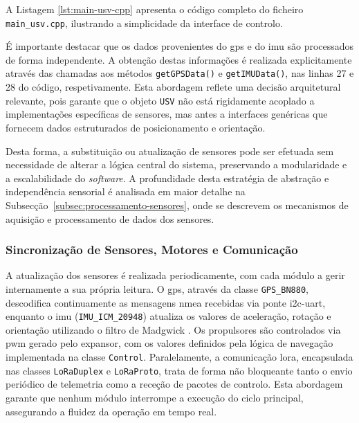 A Listagem \ref{lst:main-usv-cpp} apresenta o código completo do ficheiro \texttt{main\_usv.cpp}, ilustrando a simplicidade da interface de controlo.



É importante destacar que os dados provenientes do \gls{gps} e do \gls{imu} são processados de forma independente. A obtenção destas informações é realizada explicitamente através das chamadas aos métodos \texttt{getGPSData()} e \texttt{getIMUData()}, nas linhas 27 e 28 do código, respetivamente. Esta abordagem reflete uma decisão arquitetural relevante, pois garante que o objeto \texttt{USV} não está rigidamente acoplado a implementações específicas de sensores, mas antes a interfaces genéricas que fornecem dados estruturados de posicionamento e orientação.  

Desta forma, a substituição ou atualização de sensores pode ser efetuada sem necessidade de alterar a lógica central do sistema, preservando a modularidade e a escalabilidade do \emph{software}. A profundidade desta estratégia de abstração e independência sensorial é analisada em maior detalhe na Subsecção~\ref{subsec:processamento-sensores}, onde se descrevem os mecanismos de aquisição e processamento de dados dos sensores.

\subsubsection{Sincronização de Sensores, Motores e Comunicação}  

A atualização dos sensores é realizada periodicamente, com cada módulo a gerir internamente a sua própria leitura. O \gls{gps}, através da classe \texttt{GPS\_BN880}, descodifica continuamente as mensagens \gls{nmea} recebidas via ponte \gls{i2c}-\gls{uart}, enquanto o \gls{imu} (\texttt{IMU\_ICM\_20948}) atualiza os valores de aceleração, rotação e orientação utilizando o filtro de Madgwick \cite{madgwick-filter}. Os propulsores são controlados via \gls{pwm} gerado pelo expansor, com os valores definidos pela lógica de navegação implementada na classe \texttt{Control}. Paralelamente, a comunicação \gls{lora}, encapsulada nas classes \texttt{LoRaDuplex} e \texttt{LoRaProto}, trata de forma não bloqueante tanto o envio periódico de telemetria como a receção de pacotes de controlo. Esta abordagem garante que nenhum módulo interrompe a execução do ciclo principal, assegurando a fluidez da operação em tempo real.

